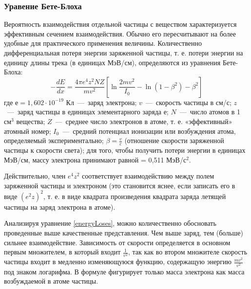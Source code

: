 \documentclass[a4paper, 14pt]{article}
\begin{document}
\subsubsection{Уравение Бете-Блоха}
Вероятность взаимодействия отдельной частицы с веществом характеризуется
эффективным сечением взаимодействия. Обычно его пересчитывают на более
удобные для практического применения величины. Количественно дифференциальная
потеря энергии заряженной частицы, т. е. потери энергии на единицу длины трека (в
единицах МэВ/см), определяются из уравнения Бете-Блоха:
\begin{equation} \label{energyLoses}
    -\frac{d E}{d x}=\frac{4 \pi e^{4} z^{2} N Z}{m v^{2}}\left[\ln \frac{2 m v^{2}}{I_{0}}-\ln \left(1-\beta^{2}\right)-\beta^{2}\right]
\end{equation}
где $е = 1,602\cdot10^{-19}$ Кл~---~заряд электрона; $v$~---~скорость частицы в см/с; $z$~---~заряд
частицы в единицах элементарного заряда е; $N$~---~число атомов в 1 см$^3$ вещества; $Z$~---~среднее число электронов в атоме, т. е. «эффективный» атомный номер; $I_0$~---~средний
потенциал ионизации или возбуждения атома, определяемый экспериментально;
$\beta = \frac{v}{c}$ (отношение скорости заряженной частицы к скорости света); для того, чтобы
получить потери энергии в единицах МэВ/см, массу электрона принимают равной
= 0,511 МэВ/с$^2$. 

Действительно, член $e^4z^2$ соответствует взаимодействию между полем
заряженной частицы и электроном (это становится яснее, если записать его в виде
$(e^2z)^2$, т. е. в виде квадрата произведения квадрата заряда летящей частицы на заряд
электрона в атоме).

Анализируя уравнение \ref{energyLoses}, можно количественно обосновать проведенные выше
качественные представления. Чем выше заряд, тем (больше) сильнее взаимодействие.
Зависимость от скорости определяется в основном первым множителем, в который
входит $\frac{1}{v^2}$, так как во втором множителе скорость частицы входит в медленно
изменяющуюся функцию, содержащую энергию $\frac{mv^2}{v^2}$ под знаком логарифма. В
формуле фигурирует только масса электрона как масса возбуждаемой в атоме
частицы.
\end{document}
